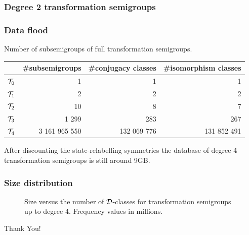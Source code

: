 \documentclass{beamer}
\newcommand{\cT}{{\cal T}}
\newcommand{\cD}{{\cal D}}
\newcommand{\gap}{\vskip10pt}
\begin{document}
\begin{frame}\frametitle{Degree 2 transformation semigroups}
\begin{center}
\scalebox{0.8}{

}
\end{center}
\end{frame}

\begin{frame}\frametitle{Data flood}

Number of subsemigroups of full transformation semigroups.

\gap
\footnotesize
\renewcommand{\arraystretch}{1}
\begin{tabular}{|c|r|r|r|}
\hline
 & \#subsemigroups & \#conjugacy classes & \#isomorphism classes \\
\hline
$\cT_0$ & 1  & 1 & 1\\
\hline
$\cT_1$ & 2  & 2 & 2\\
\hline
$\cT_2$ & 10  & 8& 7\\
\hline
$\cT_3$ & 1 299 & 283 & 267\\
\hline
$\cT_4$ & 3 161 965 550 & 132 069 776& 131 852 491\\
\hline
\end{tabular}
\normalsize
\gap
After discounting the state-relabelling symmetries the  database of degree 4 transformation semigroups is still around 9GB.
\end{frame}

\begin{frame}\frametitle{Size distribution}
  \scalebox{0.8}{}
\end{frame}

\begin{frame}
\begin{figure}
\scalebox{0.75}{

}
\caption{Size versus the number of $\cD$-classes for transformation semigroups up to degree 4. Frequency values in millions.}
\label{fig:T4SvsD}
\end{figure}
\end{frame}

\begin{frame}
\begin{center}\Huge Thank You!\end{center}
\end{frame}
\end{document}
